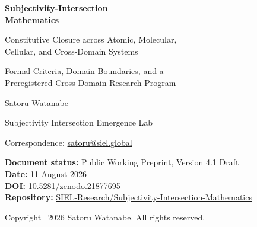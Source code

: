 \documentclass[11pt,a4paper]{article}
\begin{document}
\begin{titlepage}
\thispagestyle{empty}
\vspace*{18mm}
{\sffamily\bfseries\color{SIELblue}\fontsize{24}{29}\selectfont
\mbox{Subjectivity-Intersection}\\Mathematics\par}
\vspace{6mm}
{\sffamily\fontsize{18}{23}\selectfont
Constitutive Closure across Atomic, Molecular,\\Cellular, and Cross-Domain Systems\par}
\vspace{7mm}
{\sffamily\fontsize{15}{19}\selectfont
Formal Criteria, Domain Boundaries, and a\\Preregistered Cross-Domain Research Program\par}

\vspace{18mm}
{\large Satoru Watanabe\par}
\vspace{2mm}
{\normalsize Subjectivity Intersection Emergence Lab\par}
{\normalsize Correspondence: \href{mailto:satoru@siel.global}{satoru@siel.global}\par}

\vfill
\noindent\colorbox{SIELlight}{%
  \parbox{0.93\textwidth}{%
  \vspace{2mm}
  \textbf{Document status:} Public Working Preprint, Version 4.1 Draft\\
  \textbf{Date:} 11 August 2026\\
  \textbf{DOI:} \href{https://doi.org/10.5281/zenodo.21877695}{10.5281/zenodo.21877695}\\
  \textbf{Repository:} \href{https://github.com/SIEL-Research/Subjectivity-Intersection-Mathematics}{SIEL-Research/Subjectivity-Intersection-Mathematics}\\
  \vspace{2mm}
  }}

\vspace{10mm}
{\small Copyright \textcopyright\ 2026 Satoru Watanabe. All rights reserved.\par}
\end{titlepage}
\end{document}
